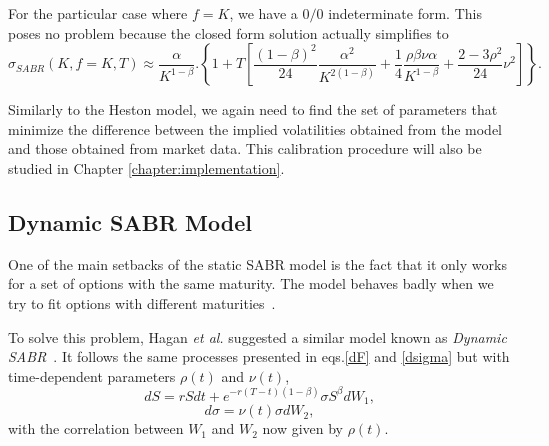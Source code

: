 For the particular case where $f=K$, we have a $0/0$ indeterminate form. This poses no problem because the closed form solution actually simplifies to~\cite{Hagan}
\begin{equation}
\sigma_{SABR}(K,f=K,T)\approx\frac{\alpha}{K^{1-\beta}}.\left\{1+T\left[\frac{(1-\beta)^2}{24}\frac{\alpha^2}{K^{2(1-\beta)}}+\frac{1}{4}\frac{\rho\beta\nu\alpha}{K^{1-\beta}}+\frac{2-3\rho^2}{24}\nu^2\right]\right\}.
\end{equation}

Similarly to the Heston model, we again need to find the set of parameters that minimize the difference between the implied volatilities obtained from the model and those obtained from market data. This calibration procedure will also be studied in Chapter \ref{chapter:implementation}.


\subsection{Dynamic SABR Model}
One of the main setbacks of the static SABR model is the fact that it only works for a set of options with the same maturity. The model behaves badly when we try to fit options with different maturities~\cite{Hagan}. 

To solve this problem, Hagan \textit{et al.} suggested a similar model known as \emph{Dynamic SABR}~\cite{Hagan}. It follows the same processes presented in eqs.\eqref{dF} and \eqref{dsigma} but with time-dependent parameters $\rho(t)$ and $\nu(t)$,
\begin{equation}\label{dF2}
\boxed{dS=rSdt+e^{-r(T-t)(1-\beta)}\sigma S^\beta dW_1,}
\end{equation}
\begin{equation}\label{dsigma2}
\boxed{d\sigma=\nu(t)\sigma dW_2,}
\end{equation}
\noindent with the correlation between $W_1$ and $W_2$ now given by $\rho(t)$.



